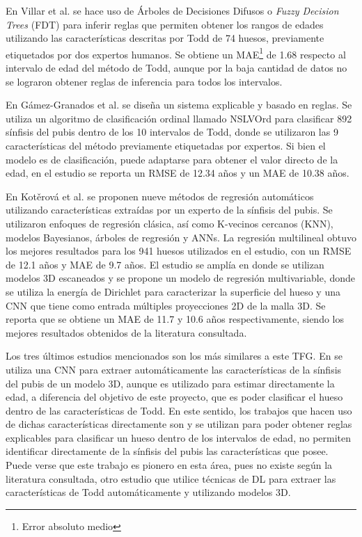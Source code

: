 En Villar et al. \cite{villar2017first} se hace uso de Árboles de Decisiones Difusos o \textit{Fuzzy Decision Trees} (FDT) para inferir reglas que permiten obtener los rangos de edades utilizando las características descritas por Todd de 74 huesos, previamente etiquetados por dos expertos humanos. Se obtiene un MAE\footnote{Error absoluto medio} de 1.68 respecto al intervalo de edad del método de Todd, aunque por la baja cantidad de datos no se lograron obtener reglas de inferencia para todos los intervalos. 

En Gámez-Granados et al. \cite{granados} se diseña un sistema explicable y basado en reglas. Se utiliza un algoritmo de clasificación ordinal llamado NSLVOrd \cite{gamez2016ordinal} para clasificar 892 sínfisis del pubis dentro de los 10 intervalos de Todd, donde se utilizaron las 9 características del método previamente etiquetadas por expertos. Si bien el modelo es de clasificación, puede adaptarse para obtener el valor directo de la edad, en el estudio se reporta un RMSE de 12.34 años y un MAE de 10.38 años.

En Kotěrová et al. \cite{kotverova2018age} se proponen nueve métodos de regresión automáticos utilizando características extraídas por un experto de la sínfisis del pubis. Se utilizaron enfoques de regresión clásica, así como K-vecinos cercanos (KNN), modelos Bayesianos, árboles de regresión y ANNs. La regresión multilineal obtuvo los mejores resultados para los 941 huesos utilizados en el estudio, con un RMSE de 12.1 años y MAE de 9.7 años. El estudio se amplía en \cite{koterova_computational_2022} donde se utilizan modelos 3D escaneados y se propone un modelo de regresión multivariable, donde se utiliza la energía de Dirichlet para caracterizar la superficie del hueso y una CNN que tiene como entrada múltiples proyecciones 2D de la malla 3D. Se reporta que se obtiene un MAE de 11.7 y 10.6 años respectivamente, siendo los mejores resultados obtenidos de la literatura consultada.

Los tres últimos estudios mencionados son los más similares a este TFG. En \cite{koterova_computational_2022} se utiliza una CNN para extraer automáticamente las características de la sínfisis del pubis de un modelo 3D, aunque es utilizado para estimar directamente la edad, a diferencia del objetivo de este proyecto, que es poder clasificar el hueso dentro de las características de Todd. En este sentido, los trabajos que hacen uso de dichas características directamente son \cite{villar2017first, granados} y se utilizan para poder obtener reglas explicables para clasificar un hueso dentro de los intervalos de edad, no permiten identificar directamente de la sínfisis del pubis las características que posee. Puede verse que este trabajo es pionero en esta área, pues no existe según la literatura consultada, otro estudio que utilice técnicas de DL para extraer las características de Todd automáticamente y utilizando modelos 3D.

